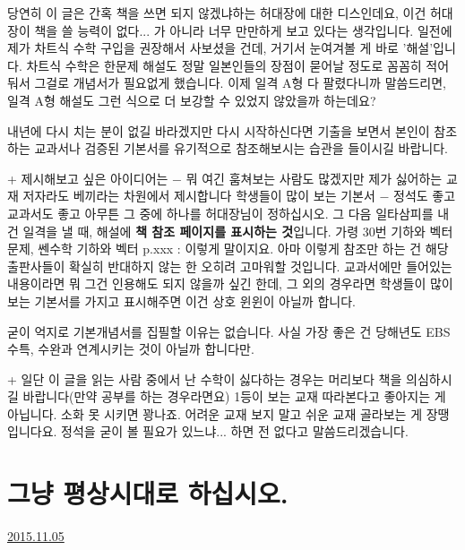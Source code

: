 당연히 이 글은 간혹 책을 쓰면 되지 않겠냐하는 허대장에 대한 디스인데요,
이건 허대장이 책을 쓸 능력이 없다... 가 아니라 너무 만만하게 보고 있다는 생각입니다.
일전에 제가 차트식 수학 구입을 권장해서 사보셨을 건데, 거기서 눈여겨볼 게 바로 '해설'입니다.
차트식 수학은 한문제 해설도 정말 일본인들의 장점이 묻어날 정도로 꼼꼼히 적어둬서 그걸로 개념서가 필요없게 했습니다.
이제 일격 A형 다 팔렸다니까 말씀드리면, 일격 A형 해설도 그런 식으로 더 보강할 수 있었지 않았을까 하는데요?
\vspace{5mm}

내년에 다시 치는 분이 없길 바라겠지만 다시 시작하신다면
기출을 보면서 본인이 참조하는 교과서나 검증된 기본서를 유기적으로 참조해보시는 습관을 들이시길 바랍니다.
\vspace{5mm}

+ 제시해보고 싶은 아이디어는 $-$ 뭐 여긴 훔쳐보는 사람도 많겠지만 제가 싫어하는 교재 저자라도 베끼라는 차원에서 제시합니다
학생들이 많이 보는 기본서 $-$ 정석도 좋고 교과서도 좋고 아무튼 그 중에 하나를 허대장님이 정하십시오.
그 다음 일타삼피를 내건 일격을 낼 때, 해설에 \textbf{책 참조 페이지를 표시하는 것}입니다.
가령 30번 기하와 벡터 문제,  쎈수학 기하와 벡터 p.xxx : 이렇게 말이지요.
아마 이렇게 참조만 하는 건 해당 출판사들이 확실히 반대하지 않는 한 오히려 고마워할 것입니다.
교과서에만 들어있는 내용이라면 뭐 그건 인용해도 되지 않을까 싶긴 한데, 그 외의 경우라면
학생들이 많이 보는 기본서를 가지고 표시해주면 이건 상호 윈윈이 아닐까 합니다.
\vspace{5mm}

굳이 억지로 기본개념서를 집필할 이유는 없습니다.
사실 가장 좋은 건 당해년도 EBS 수특, 수완과 연계시키는 것이 아닐까 합니다만.
\vspace{5mm}

+ 일단 이 글을 읽는 사람 중에서 난 수학이 싫다하는 경우는 머리보다 책을 의심하시길 바랍니다(만약 공부를 하는 경우라면요)
1등이 보는 교재 따라본다고 좋아지는 게 아닙니다. 소화 못 시키면 꽝나죠.
어려운 교재 보지 말고 쉬운 교재 골라보는 게 장땡입니다요. 정석을 굳이 볼 필요가 있느냐... 하면 전 없다고 말씀드리겠습니다.
\vspace{5mm}








\section{그냥 평상시대로 하십시오.}
\href{https://www.kockoc.com/Apoc/465514}{2015.11.05}

